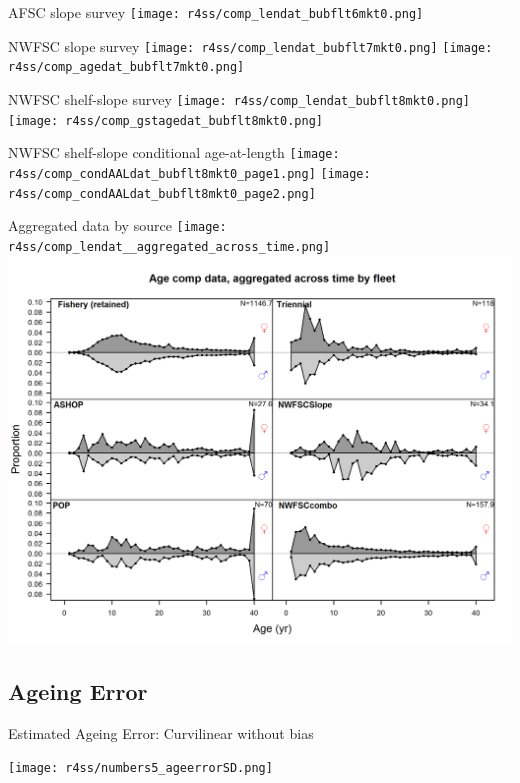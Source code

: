 \documentclass[pdf]{beamer}\usepackage[]{graphicx}\usepackage[]{color}
\begin{document}
\begin{frame}{AFSC slope survey }
  \texttt{[image: r4ss/comp\_lendat\_bubflt6mkt0.png]}
  
\end{frame}

\begin{frame}{NWFSC slope survey }
    \texttt{[image: r4ss/comp\_lendat\_bubflt7mkt0.png]}
    \texttt{[image: r4ss/comp\_agedat\_bubflt7mkt0.png]}

\end{frame}

\begin{frame}{NWFSC shelf-slope survey }
  \texttt{[image: r4ss/comp\_lendat\_bubflt8mkt0.png]}
  \texttt{[image: r4ss/comp\_gstagedat\_bubflt8mkt0.png]}
\end{frame}


\begin{frame}{NWFSC shelf-slope conditional age-at-length}
    \texttt{[image: r4ss/comp\_condAALdat\_bubflt8mkt0\_page1.png]}
    \texttt{[image: r4ss/comp\_condAALdat\_bubflt8mkt0\_page2.png]}
\end{frame}


\begin{frame}{Aggregated data by source}
    \texttt{[image: r4ss/comp\_lendat\_\_aggregated\_across\_time.png]}
    \includegraphics[scale = 0.37]{figures/comp_agedat__aggregated_across_time.png}
\end{frame}


\subsection{Ageing Error}
\begin{frame}{Estimated Ageing Error: Curvilinear without bias}
  \begin{center}
    \texttt{[image: r4ss/numbers5\_ageerrorSD.png]}
  \end{center}
\end{frame}
\end{document}
